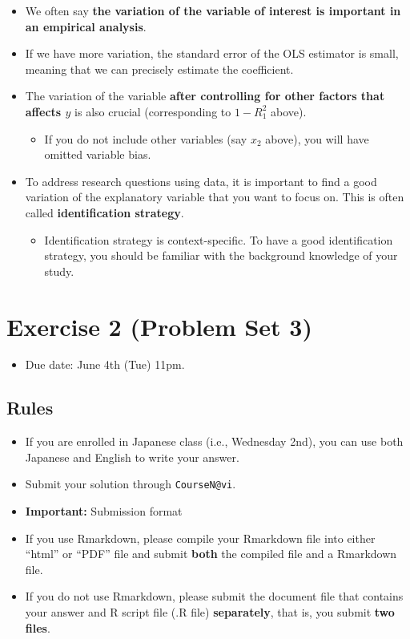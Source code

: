 \documentclass[]{book}
\providecommand{\tightlist}{%
  \setlength{\itemsep}{0pt}\setlength{\parskip}{0pt}}
\begin{document}
\begin{itemize}
\tightlist
\item
  We often say \textbf{the variation of the variable of interest is
  important in an empirical analysis}.
\item
  If we have more variation, the standard error of the OLS estimator is
  small, meaning that we can precisely estimate the coefficient.
\item
  The variation of the variable \textbf{after controlling for other
  factors that affects \(y\)} is also crucial (corresponding to
  \(1-R_1^2\) above).

  \begin{itemize}
  \tightlist
  \item
    If you do not include other variables (say \(x_2\) above), you will
    have omitted variable bias.
  \end{itemize}
\item
  To address research questions using data, it is important to find a
  good variation of the explanatory variable that you want to focus on.
  This is often called \textbf{identification strategy}.

  \begin{itemize}
  \tightlist
  \item
    Identification strategy is context-specific. To have a good
    identification strategy, you should be familiar with the background
    knowledge of your study.
  \end{itemize}
\end{itemize}

\chapter{Exercise 2 (Problem Set 3)}\label{exercise-2-problem-set-3}

\begin{itemize}
\tightlist
\item
  Due date: June 4th (Tue) 11pm.
\end{itemize}

\section{Rules}\label{rules}

\begin{itemize}
\tightlist
\item
  If you are enrolled in Japanese class (i.e., Wednesday 2nd), you can
  use both Japanese and English to write your answer.
\item
  Submit your solution through \texttt{CourseN@vi}.
\item
  \textbf{Important:} Submission format
\item
  If you use Rmarkdown, please compile your Rmarkdown file into either
  ``html'' or ``PDF'' file and submit \textbf{both} the compiled file
  and a Rmarkdown file.
\item
  If you do not use Rmarkdown, please submit the document file that
  contains your answer and R script file (.R file) \textbf{separately},
  that is, you submit \textbf{two files}.
\end{itemize}
\end{document}
